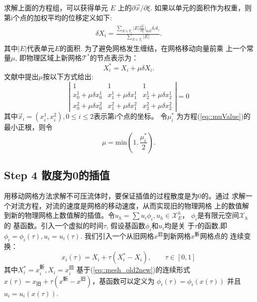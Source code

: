   求解上面的方程组，可以获得单元 $E$ 上的$\partial \vec{x} / \partial
  \xi$. 如果以单元的面积作为权重，则第i个点的加权平均的位移定义如下:
  \begin{eqnarray}
    \delta X_i = \frac{\sum\limits_{E \in T_i} |E| \frac{\partial
        \vec{x}}{\partial \xi}|_{\text{in} E} \delta
      \mathcal{A}_i}{\sum\limits_{E \in T_i} |E|}.
  \end{eqnarray}
  其中$|E|$代表单元$E$的面积. 为了避免网格发生缠结，在网格移动向量前乘
  上一个常量$\mu$, 即物理区域上新网格$\mathcal{T}^*$的节点表示为：
  \begin{equation}
    X_i^* = X_i + \mu \delta X_i.
  \end{equation}
  文献\cite{di2005moving}中提出$\mu$按以下方式给出:
  \begin{equation}
    \left |
      \begin{array}{ccc}
        1 & 1 & 1 \\
        x_0^1 + \mu \delta x_0^1 & x_1^1 + \mu \delta x_1^1 & x_2^1 +
        \mu \delta x_2^1 \\
        x_0^2 + \mu \delta x_0^2 & x_1^2 + \mu \delta x_1^2 & x_2^2 +
        \mu \delta x_2 ^2
      \end{array}
    \right | = 0
    \label{eq::muValue}
  \end{equation}
  其中$ \vec{x}_i = (x_i^1, x_i^2), 0 \leq i \leq 2$表示第i个点的坐标。
  令$\mu_i^*$ 为方程(\ref{eq::muValue})的最小正根，则令
  \begin{equation}
    \mu = \text{min} (1, \frac{\mu_i^*}{2}).
  \end{equation}

  \subsection{Step 4 散度为0的插值}
    用移动网格方法求解不可压流体时，要保证插值的过程散度是为0的。通过
    求解一个对流方程，对流的速度是网格的移动速度，从而实现旧的物理网格
    上的数值解到新的物理网格上数值解的插值。令$u_h = \sum u_i \phi_i,
    u_h \in \mathcal{X}_E^h$， $\phi_i$是有限元空间$\mathcal{X}_h$的
    基函数。引入一个虚拟的时间$\tau$, 假设基函数$\phi_i$和$u_i$均是关
    于$\tau$的函数,即$\phi_i = \phi_i(\tau), u_i = u_i(\tau)$.
    我们引入一个从旧网格$x^{\text{旧}}$到新网格$x^{\text{新}}$网格点的
    连续变换：
    \begin{equation}
       x_i(\tau) = X_i + \tau (X_i^* - X_i), \qquad \tau \in [0, 1]
       \label{eq::mesh_old2new}
    \end{equation}
    其中$X_i^* = x_i^{\text{新}}, X_i = x_i^{\text{旧}}$
    基于(\ref{eq::mesh_old2new})的连续形式$x(\tau) = x_{\text{旧}} +
    \tau (x^{\text{新}} - x^{\text{旧}})$，基函数可以定义为
    $\phi_i(\tau) = \phi_i(x(\tau))$ 并且 $u_i = u_i(x(\tau))$.

